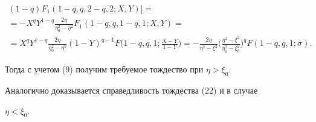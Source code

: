 \begin{pf}
\begin{gather*}
(1-q)F_1(1-q,q,2-q,2;X,Y)]= \\


%


=-X^q Y^{1-q} \frac{2\eta}


{\eta_0^2-\eta^2}F_1(1-q,q,1-q,1;X,Y)= \\


%


=X^q Y^{1-q} \frac{2\eta}{\eta_0^2-\eta^2}(1-Y)^{q-1} 


F\bigg(1-q,q,1;\frac{X-Y}{1-Y}\bigg)=


-\frac{2\eta}{\eta^2-\xi^2}


\bigg(\frac{\eta^2-\xi^2}{\eta_0^2-\xi_0^2}\bigg)^q F(1-q,q,1;\sigma).


\end{gather*}


Тогда с учетом (9) получим требуемое тождество при $\eta>\xi_0$.





Аналогично доказывается справедливость тождества (22) и в случае


$\eta<\xi_0$.


\end{pf}





